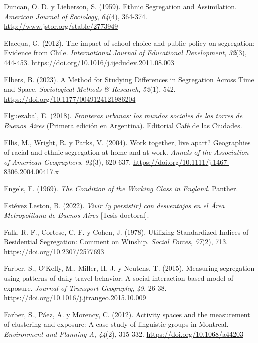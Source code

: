 \documentclass[
  spanish,
  a4paper,%
  chapterprefix=true,%
  DIV=calc,%
  twoside]{scrbook}%
\newlength{\cslhangindent}
\newenvironment{CSLReferences}[2] %
 {\begin{list}{}{%
  \setlength{\itemindent}{0pt}
  \setlength{\leftmargin}{0pt}
  \setlength{\parsep}{0pt}
  \ifodd #1
   \setlength{\leftmargin}{\cslhangindent}
   \setlength{\itemindent}{-1\cslhangindent}
  \fi
  \setlength{\itemsep}{#2\baselineskip}}}
 {\end{list}}
\begin{document}
\begin{CSLReferences}{1}{0}
Duncan, O. D. y Lieberson, S. (1959). Ethnic Segregation and Assimilation. \emph{American Journal of Sociology}, \emph{64}(4), 364-374. \url{http://www.jstor.org/stable/2773949}

Elacqua, G. (2012). The impact of school choice and public policy on segregation: Evidence from Chile. \emph{International Journal of Educational Development}, \emph{32}(3), 444-453. \url{https://doi.org/10.1016/j.ijedudev.2011.08.003}

Elbers, B. (2023). A Method for Studying Differences in Segregation Across Time and Space. \emph{Sociological Methods \& Research}, \emph{52}(1), 542. \url{https://doi.org/10.1177/0049124121986204}

Elguezabal, E. (2018). \emph{Fronteras urbanas: los mundos sociales de las torres de Buenos Aires} (Primera edición en Argentina). Editorial Café de las Ciudades.

Ellis, M., Wright, R. y Parks, V. (2004). Work together, live apart? Geographies of racial and ethnic segregation at home and at work. \emph{Annals of the Association of American Geographers}, \emph{94}(3), 620-637. \url{https://doi.org/10.1111/j.1467-8306.2004.00417.x}

Engels, F. (1969). \emph{The Condition of the Working Class in England}. Panther.

Estévez Leston, B. (2022). \emph{Vivir (y persistir) con desventajas en el Área Metropolitana de Buenos Aires} {[}Tesis doctoral{]}.

Falk, R. F., Cortese, C. F. y Cohen, J. (1978). Utilizing Standardized Indices of Residential Segregation: Comment on Winship. \emph{Social Forces}, \emph{57}(2), 713. \url{https://doi.org/10.2307/2577693}

Farber, S., O'Kelly, M., Miller, H. J. y Neutens, T. (2015). Measuring segregation using patterns of daily travel behavior: A social interaction based model of exposure. \emph{Journal of Transport Geography}, \emph{49}, 26-38. \url{https://doi.org/10.1016/j.jtrangeo.2015.10.009}

Farber, S., Páez, A. y Morency, C. (2012). Activity spaces and the measurement of clustering and exposure: A case study of linguistic groups in Montreal. \emph{Environment and Planning A}, \emph{44}(2), 315-332. \url{https://doi.org/10.1068/a44203}


\end{CSLReferences}
\end{document}
